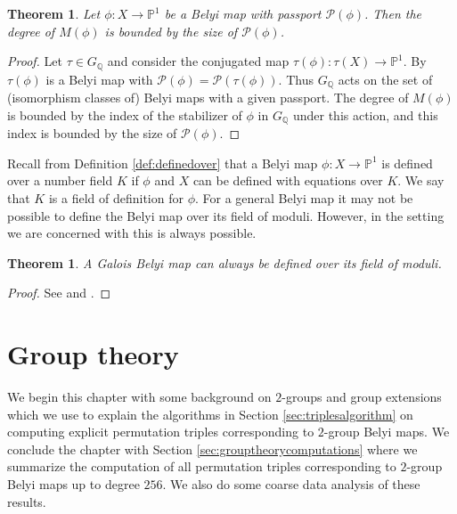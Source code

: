 \documentclass{dcthesis}
\newcommand{\PP}{\mathbb P}
\newcommand{\QQ}{\mathbb Q}
\newcommand{\defi}[1]{\textsf{#1}}
\numberwithin{equation}{section}
\newtheorem{theorem}[equation]{Theorem}
\theoremstyle{definition}
\theoremstyle{remark}
\begin{document}
{{{    %
    \begin{theorem}\label{thm:fieldofmoduli}
      Let $\phi:X\to\PP^1$ be a Belyi map
      with passport $\mathcal{P}(\phi)$.
      Then the degree
      of $M(\phi)$
      is bounded by the size of
      $\mathcal{P}(\phi)$.
    \end{theorem}
    \begin{proof}
      Let $\tau\in G_\QQ$ and consider the
      conjugated map
      $\tau(\phi)\colon \tau(X)\to\PP^1$.
      By \cite[Appendix]{jones_streit_manfred}
      $\tau(\phi)$ is a Belyi map with
      $\mathcal{P}(\phi) =
      \mathcal{P}(\tau(\phi))$.
      Thus $G_\QQ$ acts on the set
      of (isomorphism classes of) Belyi maps with
      a given passport.
      The degree of $M(\phi)$
      is bounded by the index of the
      stabilizer of $\phi$ in $G_\QQ$
      under this action,
      and this index is bounded by
      the size of $\mathcal{P}(\phi)$.
    \end{proof}
    Recall from Definition \ref{def:definedover}
    that a Belyi map
    $\phi\colon X\to\PP^1$
    is defined over a number field $K$
    if $\phi$ and $X$ can be defined with
    equations over $K$.
    We say that $K$
    is a \defi{field of definition}
    for $\phi$.
    For a general Belyi map it may not be possible
    to define the Belyi map over its field
    of moduli.
    However,
    in the setting we are concerned with
    this is always possible.
    \begin{theorem}
      \label{thm:galoisbelyimapoverfieldofmoduli}
      A Galois Belyi map can always be defined over
      its field of moduli.
    \end{theorem}
    \begin{proof}
      See 
      \cite[Proposition 2.5]{coombes_harbater}
      and
      \cite[Theorem 2.2]{kock}.
    \end{proof}
  }
}
\chapter{Group theory}{\label{chapter:grouptheory}
  We begin this chapter with some background
  on $2$-groups and group extensions which we
  use to explain the algorithms
  in Section \ref{sec:triplesalgorithm}
  on computing explicit permutation
  triples corresponding to $2$-group Belyi maps.
  We conclude the chapter with 
  Section \ref{sec:grouptheorycomputations}
  where we summarize the computation
  of all permutation triples corresponding
  to $2$-group Belyi maps up to degree $256$.
  We also do some coarse data analysis of these
  results.
}}
\end{document}
